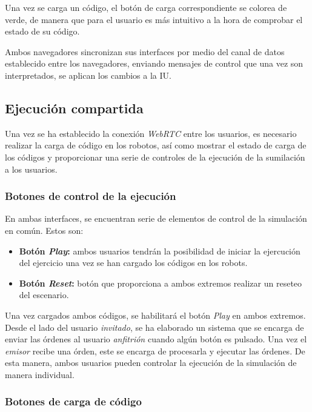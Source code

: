 \documentclass[a4paper, 12pt]{book}
\begin{document}
Una vez se carga un código, el botón de carga correspondiente se colorea de verde, de manera que para el usuario es más intuitivo a la hora de comprobar el estado de su código.

Ambos navegadores sincronizan sus interfaces por medio del canal de datos establecido entre los navegadores, enviando mensajes de control que una vez son interpretados, se aplican los cambios a la IU.

\subsection{Ejecución compartida}

Una vez se ha establecido la conexión \emph{WebRTC} entre los usuarios, es necesario realizar la carga de código en los robotos, así como mostrar el estado de carga de los códigos y proporcionar una serie de controles de la ejecución de la sumilación a los usuarios.

\subsubsection{Botones de control de la ejecución}

En ambas interfaces, se encuentran serie de elementos de control de la simulación en común. Estos son:

\begin{itemize}
\item \textbf{Botón \emph{Play}:} ambos usuarios tendrán la posibilidad de iniciar la ejercución del ejercicio una vez se han cargado los códigos en los robots.

\item \textbf{Botón \emph{Reset}:} botón que proporciona a ambos extremos realizar un reseteo del escenario.
\end{itemize}


Una vez cargados ambos códigos, se habilitará el botón \emph{Play} en ambos extremos. Desde el lado del usuario \emph{invitado}, se ha elaborado un sistema que se encarga de enviar las órdenes al usuario \emph{anfitrión} cuando algún botón es pulsado. Una vez el \emph{emisor} recibe una órden, este se encarga de procesarla y ejecutar las órdenes. De esta manera, ambos usuarios pueden controlar la ejecución de la simulación de manera individual.

\subsubsection{Botones de carga de código}
\end{document}

